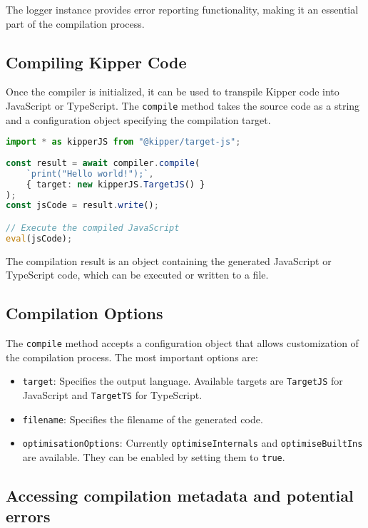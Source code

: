 The logger instance provides error reporting functionality, making it an essential part of the compilation process.

\subsection{Compiling Kipper Code}
\label{subsec:compiling}

Once the compiler is initialized, it can be used to \gls{transpile} Kipper code into JavaScript or TypeScript. The \lstinline|compile| method takes the source code as a string and a configuration object specifying the compilation target.

\begin{lstlisting}[language=Typescript, caption=Compiling Kipper Code to JavaScript, label=lst:compile_example]
import * as kipperJS from "@kipper/target-js";
	
const result = await compiler.compile(
	`print("Hello world!");`,
	{ target: new kipperJS.TargetJS() }
);
const jsCode = result.write();

// Execute the compiled JavaScript
eval(jsCode);
\end{lstlisting}

The compilation result is an object containing the generated JavaScript or TypeScript code, which can be executed or written to a file.

\subsection{Compilation Options}
\label{subsec:compilation_options}

The \lstinline|compile| method accepts a configuration object that allows customization of the compilation process. The most important options are:

\begin{itemize}
	\item \lstinline|target|: Specifies the output language. Available targets are \lstinline|TargetJS| for JavaScript and \lstinline|TargetTS| for TypeScript.
	\item \lstinline|filename|: Specifies the filename of the generated code.
	\item \lstinline|optimisationOptions|: Currently
	\lstinline|optimiseInternals| and \lstinline|optimiseBuiltIns| are available. They can be enabled by setting them to \lstinline|true|.
\end{itemize}

\subsection{Accessing compilation metadata and potential errors}

